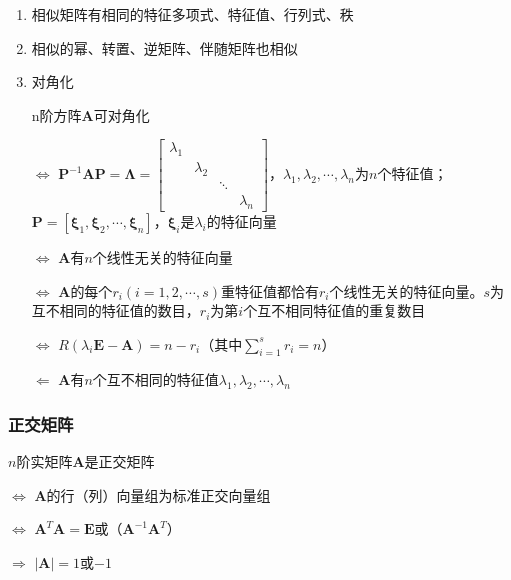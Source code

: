 \documentclass[12pt]{book}
\begin{document}
\begin{enumerate}[1.]
    \item 相似矩阵有相同的特征多项式、特征值、行列式、秩
    \item 相似的幂、转置、逆矩阵、伴随矩阵也相似
    \item 对角化
        \par n阶方阵$\bm{A}$可对角化
        \par $\Leftrightarrow$ $\bm{P}^{-1}\bm{AP}=\bm{\Lambda}=\begin{bmatrix}
           \lambda_1 &  & & \\
           & \lambda_2 & & \\
           & & \ddots & \\
           & & & \lambda_n 
        \end{bmatrix}$，$\lambda_1,\lambda_2,\cdots,\lambda_n$为$n$个特征值；$\bm{P}=[\bm{\xi}_1,\bm{\xi}_2,\cdots,\bm{\xi}_n]$，$\bm{\xi}_i$是$\lambda_i$的特征向量
        \par $\Leftrightarrow$ $\bm{A}$有$n$个线性无关的特征向量
        \par $\Leftrightarrow$ $\bm{A}$的每个$r_i(i=1,2,\cdots,s)$重特征值都恰有$r_i$个线性无关的特征向量。$s$为互不相同的特征值的数目，$r_i$为第$i$个互不相同特征值的重复数目
        \par $\Leftrightarrow$ $R(\lambda_i\bm{E}-\bm{A})=n-r_{i}$（其中$\sum_{i=1}^{s}{r_i}=n$）
        \par $\Leftarrow$ $\bm{A}$有$n$个互不相同的特征值$\lambda_1,\lambda_2,\cdots,\lambda_n$
\end{enumerate}









\subsubsection{正交矩阵}



\par $n$阶实矩阵$\bm{A}$是正交矩阵
\par $\Leftrightarrow$ $\bm{A}$的行（列）向量组为标准正交向量组
\par $\Leftrightarrow$ $\bm{A}^{T}\bm{A}=\bm{E}$或（$\bm{A}^{-1}\bm{A}^{T}$）
\par $\Rightarrow$ $|\bm{A}|=1$或$-1$
\end{document}
